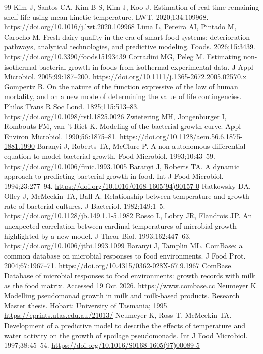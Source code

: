 {\begin{thebibliography}{99}
 Kim J, Santos CA, Kim B-S, Kim J, Koo J. Estimation of real-time remaining shelf life using mean kinetic temperature. LWT. 2020;134:109968. \url{https://doi.org/10.1016/j.lwt.2020.109968}
 Lima L, Pereira AI, Pintado M, Carocho M. Fresh dairy quality in the era of smart food systems: deterioration pathways, analytical technologies, and predictive modeling. Foods. 2026;15:3439. \url{https://doi.org/10.3390/foods15193439}
 Corradini MG, Peleg M. Estimating non-isothermal bacterial growth in foods from isothermal experimental data. J Appl Microbiol. 2005;99:187--200. \url{https://doi.org/10.1111/j.1365-2672.2005.02570.x}
 Gompertz B. On the nature of the function expressive of the law of human mortality, and on a new mode of determining the value of life contingencies. Philos Trans R Soc Lond. 1825;115:513--83. \url{https://doi.org/10.1098/rstl.1825.0026}
 Zwietering MH, Jongenburger I, Rombouts FM, van 't Riet K. Modeling of the bacterial growth curve. Appl Environ Microbiol. 1990;56:1875--81. \url{https://doi.org/10.1128/aem.56.6.1875-1881.1990}
 Baranyi J, Roberts TA, McClure P. A non-autonomous differential equation to model bacterial growth. Food Microbiol. 1993;10:43--59. \url{https://doi.org/10.1006/fmic.1993.1005}
 Baranyi J, Roberts TA. A dynamic approach to predicting bacterial growth in food. Int J Food Microbiol. 1994;23:277--94. \url{https://doi.org/10.1016/0168-1605(94)90157-0}
 Ratkowsky DA, Olley J, McMeekin TA, Ball A. Relationship between temperature and growth rate of bacterial cultures. J Bacteriol. 1982;149:1--5. \url{https://doi.org/10.1128/jb.149.1.1-5.1982}
 Rosso L, Lobry JR, Flandrois JP. An unexpected correlation between cardinal temperatures of microbial growth highlighted by a new model. J Theor Biol. 1993;162:447--63. \url{https://doi.org/10.1006/jtbi.1993.1099}
 Baranyi J, Tamplin ML. ComBase: a common database on microbial responses to food environments. J Food Prot. 2004;67:1967--71. \url{https://doi.org/10.4315/0362-028X-67.9.1967}
 ComBase. Database of microbial responses to food environments: growth records with milk as the food matrix. Accessed 19 Oct 2026. \url{https://www.combase.cc}
 Neumeyer K. Modelling pseudomonad growth in milk and milk-based products. Research Master thesis. Hobart: University of Tasmania; 1995. \url{https://eprints.utas.edu.au/21013/}
 Neumeyer K, Ross T, McMeekin TA. Development of a predictive model to describe the effects of temperature and water activity on the growth of spoilage pseudomonads. Int J Food Microbiol. 1997;38:45--54. \url{https://doi.org/10.1016/S0168-1605(97)00089-5}

\end{thebibliography}}
